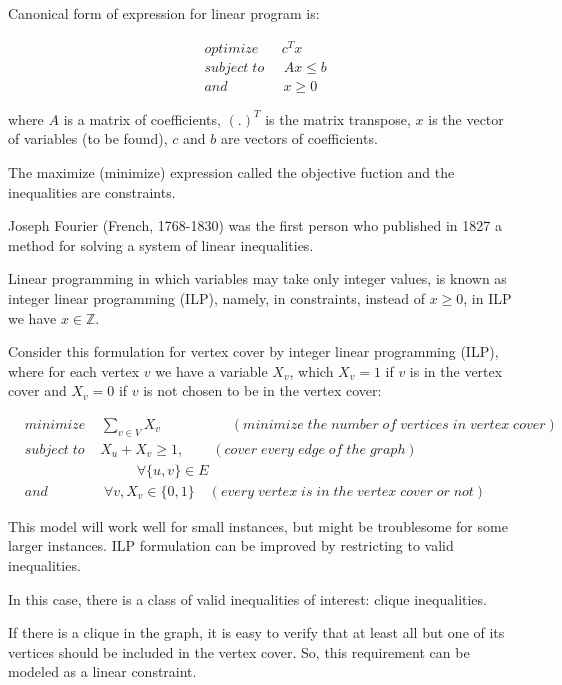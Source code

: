 \documentclass{beamer}
\begin{document}
{\begin{defi}
\begin{defi}
Canonical form of expression for linear program is:

\begin{align*}
&optimize \; \;\; \;\;\; c^Tx\\
&subject\; to \;\;\; \;\; Ax \leq b\\
&and	\qquad\qquad	 x \geq 0
\end{align*}

where $A$ is a matrix of coefficients, $(.)^T$ is the matrix transpose, $x$ is the vector of variables (to be found), $c$ and $b$ are vectors of coefficients.

The maximize (minimize) expression called the objective fuction and the inequalities are constraints.

Joseph Fourier (French, 1768-1830) was the first person who published in 1827 a method for solving a system of linear inequalities. \cite{gerard}

Linear programming in which variables may take only integer values, is known as integer linear programming (ILP), namely, in constraints, instead of $x\geq 0$, in ILP we have $x\in \mathbb{Z}$.
\end{defi}


Consider this formulation for vertex cover by integer linear programming (ILP), where for each vertex $v$ we have a variable $X_v$, which $X_v = 1$ if $v$ is in the vertex cover and $X_v = 0$ if $v$ is not chosen to be in the vertex cover:

\begin{align*}
&minimize \; \;\; \; \sum_{v\in V}X_v \qquad\qquad\quad (minimize \; the \; number \;  of \;  vertices \; in \; vertex \; cover)\\
&subject\; to \;\;\; \; X_u + X_v  \geq 1 , \qquad (cover \; every \; edge \; of \; the \; graph)\\
&\qquad 	\qquad\qquad\qquad	 \forall \{u,v\} \in E\\
&and	\qquad\qquad	 \forall v, X_v\in \{0,1\} \quad (every \; vertex \; is \; in \; the \; vertex \; cover \; or \; not)
\end{align*}

This model will work well for small instances, but might be troublesome for some larger instances. ILP formulation can be improved  by restricting to valid inequalities.\cite{Gerard2} 

In this case, there is a class of valid inequalities of interest: clique inequalities.

If there is a clique in the graph, it is easy to verify that at least all but one
of its vertices should be included in the vertex cover. So, this requirement can be modeled as a linear constraint.


\end{defi}}
\end{document}
